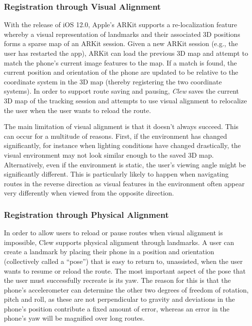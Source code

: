 \documentclass[chi_draft]{sigchi}
\begin{document}
\subsubsection{Registration through Visual Alignment}
With the release of iOS 12.0, Apple's ARKit supports a re-localization feature whereby a visual representation of landmarks and their associated 3D positions forms a sparse map of an ARKit session.  Given a new ARKit session (e.g., the user has restarted the app), ARKit can load the previous 3D map and attempt to match the phone's current image features to the map.  If a match is found, the current position and orientation of the phone are updated to be relative to the coordinate system in the 3D map (thereby registering the two coordinate systems).  In order to support route saving and pausing, \emph{Clew} saves the current 3D map of the tracking session and attempts to use visual alignment to relocalize the user when the user wants to reload the route.

The main limitation of visual alignment is that it doesn't always succeed.  This can occur for a multitude of reasons.  First, if the environment has changed significantly, for instance when lighting conditions have changed drastically, the visual environment may not look similar enough to the saved 3D map.  Alternatively, even if the environment is static, the user's viewing angle might be significantly different.  This is particularly likely to happen when navigating routes in the reverse direction as visual features in the environment often appear very differently when viewed from the opposite direction.


\subsubsection{Registration through Physical Alignment}

In order to allow users to reload or pause routes when visual alignment is impossible, Clew supports physical alignment through landmarks.  A user can create a landmark by placing their phone in a position and orientation (collectively called a ``pose'') that is easy to return to, unassisted, when the user wants to resume or reload the route.  The most important aspect of the pose that the user must successfully recreate is its yaw.  The reason for this is that the phone's accelerometer can determine the other two degrees of freedom of rotation, pitch and roll, as these are not perpendicular to gravity and deviations in the phone's position contribute a fixed amount of error, whereas an error in the phone's yaw will be magnified over long routes.
\end{document}
